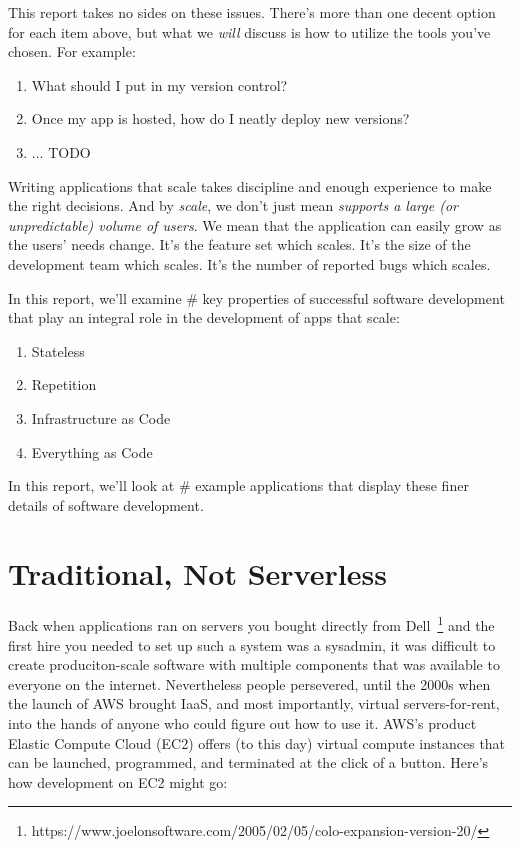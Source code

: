 \documentclass{article}
\newcommand{\term}[1]{\textit{#1}}
\newcommand{\newp}{\newline\indent}
\begin{document}
This report takes no sides on these issues.
There's more than one decent option for each item above, but what we \textit{will} discuss is how to utilize the tools you've chosen.
For example:

\begin{enumerate}
  \item What should I put in my version control?
  \item Once my app is hosted, how do I neatly deploy new versions?
  \item ... TODO
\end{enumerate}

\newp Writing applications that scale takes discipline and enough experience to make the right decisions.
And by \term{scale}, we don't just mean \term{supports a large (or unpredictable) volume of users}.
We mean that the application can easily grow as the users' needs change.
It's the feature set which scales.
It's the size of the development team which scales.
It's the number of reported bugs which scales.

In this report, we'll examine # key properties of successful software development that play an integral role in the development of apps that scale:

\begin{enumerate}
  \item Stateless
  \item Repetition
  \item Infrastructure as Code
  \item Everything as Code
\end{enumerate}

In this report, we'll look at # example applications that display these finer details of software development.

\section{Traditional, Not Serverless}

Back when applications ran on servers you bought directly from Dell~\footnote{https://www.joelonsoftware.com/2005/02/05/colo-expansion-version-20/} and the first hire you needed to set up such a system was a sysadmin, it was difficult to create produciton-scale software with multiple components that was available to everyone on the internet.
Nevertheless people persevered, until the 2000s when the launch of AWS brought IaaS, and most importantly, virtual servers-for-rent, into the hands of anyone who could figure out how to use it.
AWS's product Elastic Compute Cloud (EC2) offers (to this day) virtual compute instances that can be launched, programmed, and terminated at the click of a button.
Here's how development on EC2 might go:
\end{document}
